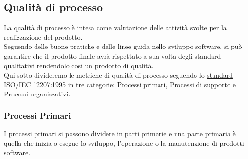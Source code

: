 \documentclass[10pt]{article}
\begin{document}
\begin{justify}
\subsection{Qualità di processo}
La qualità di processo è intesa come valutazione delle attività svolte per la realizzazione del prodotto.\\
Seguendo delle buone pratiche e delle linee guida nello sviluppo software, si può garantire che il prodotto finale avrà rispettato a sua volta degli standard qualitativi rendendolo così un prodotto di qualità.\\
Qui sotto divideremo le metriche di qualità di processo seguendo lo \hyperref[ISO 12207:1995]{standard ISO/IEC 12207:1995} in tre categorie: Processi primari, Processi di supporto e Processi organizzativi.\\
\subsubsection{Processi Primari}
I processi primari si possono dividere in parti primarie e una parte primaria è quella che inizia o esegue lo sviluppo, l'operazione o la manutenzione di prodotti software.\\

\newpage




\end{justify}
\end{document}
